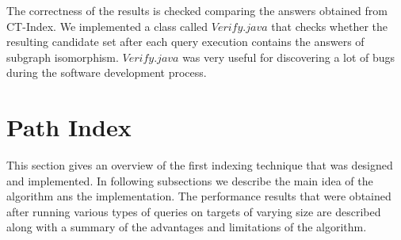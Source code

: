 \documentclass{l4proj}
\begin{document}
    The correctness of the results is checked comparing the answers obtained from CT-Index. We implemented a class called $Verify.java$ that checks whether the resulting candidate set after each query execution contains the answers of subgraph isomorphism. $Verify.java$ was very useful for discovering a lot of bugs during the software development process.
    
\section{Path Index}
\label{path-index}
This section gives an overview of the first indexing technique that was designed and implemented. In following subsections we describe the main idea of the algorithm ans the implementation. The performance results that were obtained after running various types of queries on targets of varying size are described along with a summary of the advantages and limitations of the algorithm.\par
\end{document}
